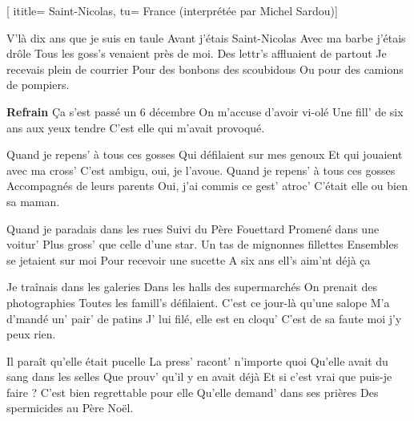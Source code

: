  [
ititle= {Saint-Nicolas},
tu= {France (interprétée par Michel Sardou)}]


\beginverse
V'là dix ans que je suis en taule
Avant j'étais Saint-Nicolas
Avec ma barbe j'étais drôle
Tous les goss's venaient près de moi.
Des lettr's affluaient de partout
Je recevais plein de courrier
Pour des bonbons des scoubidous
Ou pour des camions de pompiers.
\endverse

\beginchorus
\textbf {Refrain}
Ça s'est passé un 6 décembre
On m'accuse d'avoir vi-olé
Une fill' de six ans aux yeux tendre
C'est elle qui m'avait provoqué.
\endchorus

\beginverse
Quand je repens' à tous ces gosses
Qui défilaient sur mes genoux
Et qui jouaient avec ma cross'
C'est ambigu, oui, je l'avoue.
Quand je repens' à tous ces gosses
Accompagnés de leurs parents
Oui, j'ai commis ce gest' atroc'
C'était elle ou bien sa maman.
\endverse

\beginverse
Quand je paradais dans les rues
Suivi du Père Fouettard
Promené dans une voitur'
Plus gross' que celle d'une star.
Un tas de mignonnes fillettes
Ensembles se jetaient sur moi
Pour recevoir une sucette
A six ans ell's aim'nt déjà ça
\endverse

\beginverse
Je traînais dans les galeries
Dans les halls des supermarchés
On prenait des photographies
Toutes les famill's défilaient.
C'est ce jour-là qu'une salope
M'a d'mandé un' pair' de patins
J' lui filé, elle est en cloqu'
C'est de sa faute moi j'y peux rien.
\endverse

\beginverse
Il paraît qu'elle était pucelle
La press' racont' n'importe quoi
Qu'elle avait du sang dans les selles
Que prouv' qu'il y en avait déjà
Et si c'est vrai que puis-je faire ?
C'est bien regrettable pour elle
Qu'elle demand' dans ses prières
Des spermicides au Père Noël.
\endverse

\endsong